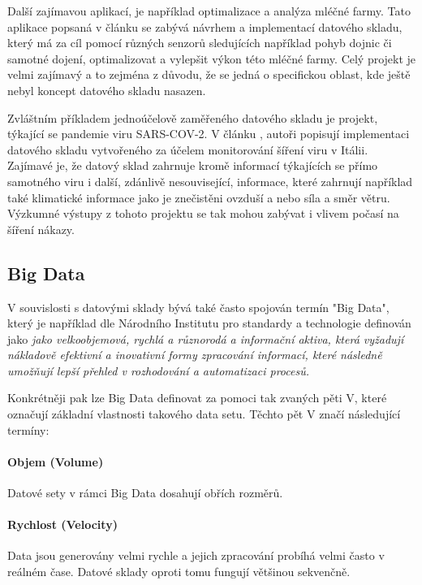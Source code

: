 \documentclass[
  digital,     %
  twoside,     %
  lof,         %
  lot,         %
]{fithesis4}
\begin{document}
Další zajímavou aplikací, je například optimalizace a analýza mléčné farmy. Tato
aplikace popsaná v článku  \parencite{Schuetz20180326} se zabývá návrhem a implementací
datového skladu, který má za cíl pomocí různých senzorů sledujících například pohyb dojnic
či samotné dojení, optimalizovat a vylepšit výkon této mléčné farmy. Celý projekt je velmi
zajímavý a to zejména z důvodu, že se jedná o specifickou oblast, kde ještě nebyl
koncept datového skladu nasazen.

Zvláštním příkladem jednoúčelově zaměřeného datového skladu je projekt, týkající
se pandemie viru SARS-COV-2. V článku  \parencite{Agapito2020},
autoři popisují implementaci datového skladu vytvořeného za účelem monitorování
šíření viru v Itálii. Zajímavé je, že datový sklad zahrnuje kromě informací týkajících se přímo
samotného viru i další, zdánlivě nesouvisející, informace, které zahrnují například také klimatické informace
jako je znečistěni ovzduší a nebo síla a směr větru. Výzkumné výstupy z tohoto projektu se tak mohou zabývat i vlivem počasí na
šíření nákazy. 

\subsection{Big Data}
V souvislosti s datovými sklady bývá také často spojován termín "Big Data", který je například dle Národního Institutu pro standardy a technologie definován jako \emph{jako velkoobjemová, rychlá a různorodá a informační aktiva, která vyžadují nákladově efektivní a inovativní formy zpracování informací, které následně umožňují lepší přehled v rozhodování a automatizaci procesů.  } \parencite{Gartner} 

Konkrétněji pak lze Big Data definovat za pomoci tak zvaných pěti V, které označují základní vlastnosti takového data setu.  Těchto pět V značí následující termíny: \parencite{big_data}
\paragraph{Objem (Volume) }
Datové sety v rámci Big Data dosahují obřích rozměrů.

\paragraph{Rychlost (Velocity)}
Data jsou generovány velmi rychle a jejich zpracování probíhá velmi často v reálném čase. Datové sklady oproti tomu fungují většinou sekvenčně.
\end{document}
